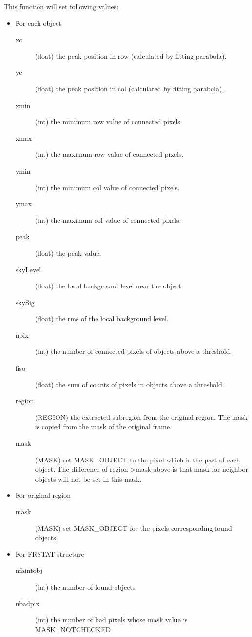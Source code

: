 This function will set following values:

\begin{itemize}
\item For each object
\begin{description}
 \item[\qquad xc](float) the peak position in row (calculated by
fitting parabola).
 \item[\qquad yc](float) the peak position in col (calculated by
fitting parabola).
 \item[\qquad xmin](int) the minimum row value of connected pixels.
 \item[\qquad xmax](int) the maximum row value of connected pixels.
 \item[\qquad ymin](int) the minimum col value of connected pixels.
 \item[\qquad ymax](int) the maximum col value of connected pixels.
 \item[\qquad peak](float) the peak value.
 \item[\qquad skyLevel](float) the local background level near the object.
 \item[\qquad skySig](float) the rms of the local background level.
 \item[\qquad npix](int) the number of connected pixels of objects
above a threshold.
 \item[\qquad fiso](float) the sum of counts of pixels in objects above a threshold.
 \item[\qquad region](REGION) the extracted subregion from the
original region. The mask is copied from the mask of the original frame.
 \item[\qquad mask](MASK) set MASK\_OBJECT to the pixel which is the
part of each object. The difference of region->mask above is that mask 
for neighbor objects will not be set in this mask.
\end{description}

\item For original region
\begin{description}
 \item[\qquad mask](MASK) set MASK\_OBJECT for the pixels
corresponding found objects.
\end{description}

\item For FRSTAT structure
\begin{description}
 \item[\qquad nfaintobj](int) the number of found objects
 \item[\qquad nbadpix](int) the number of bad pixels whose mask value
is MASK\_NOTCHECKED
\end{description}
\end{itemize}

